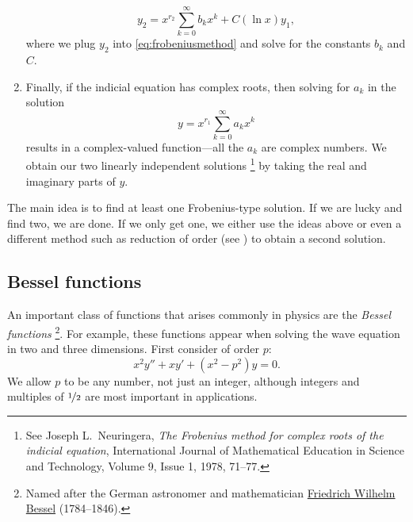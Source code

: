 \documentclass{ximera}
\begin{document}
\begin{enumerate}
\begin{equation*}
            y_2 = x^{r_2} \sum_{k=0}^\infty b_k x^{k} + C (\ln x) y_1 ,
        \end{equation*}
        where we plug $y_2$ into \eqref{eq:frobeniusmethod} and solve for the constants $b_k$ and $C$.
    \item Finally, if the indicial equation has complex roots, then solving for $a_k$ in the solution
        \begin{equation*}
            y = x^{r_1} \sum_{k=0}^\infty a_k x^{k}
        \end{equation*}
        results in a complex-valued function---all the $a_k$ are complex numbers.  We obtain our two linearly independent solutions%
        \footnote{
            See Joseph L.\ Neuringera, \emph{The Frobenius method for complex roots of the indicial equation}, International Journal of Mathematical Education in Science and Technology, Volume 9, Issue 1, 1978, 71--77.
            } 
        by taking the real and imaginary parts of $y$.
\end{enumerate}

The main idea is to find at least one Frobenius-type solution.  If we are lucky and find two, we are done. If we only get one, we either use the ideas above or even a different method such as reduction of order (see ) to obtain a second solution.

\subsection{Bessel functions} \label{bessel:subsection}

An important class of functions that arises commonly in physics are the \emph{Bessel functions}%
\footnote{Named after the German astronomer and mathematician \href{http://en.wikipedia.org/wiki/Friedrich_Bessel}{Friedrich Wilhelm Bessel} (1784--1846).}. 
For example, these functions appear when solving the wave equation in two and three dimensions.  First consider \emph{} of order $p$:
\begin{equation*}
    x^2 y'' + xy' + \left(x^2 - p^2\right)y = 0 .
\end{equation*}
We allow $p$ to be any number, not just an integer, although integers and multiples of $\nicefrac{1}{2}$ are most important in applications.
\end{document}
